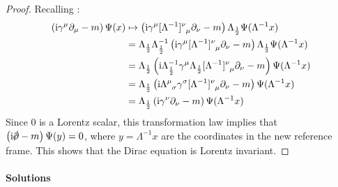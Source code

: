 \begin{proofbox}
  \begin{proof}
    Recalling :
    \begin{equation*}
      \begin{split}
        \left( \img \gamma^\mu \pa_\mu - m \right) \Psi(x)
        &\mapsto \left( \img \gamma^\mu \tensor{[\Lambda^{-1}]}{^\nu_\mu} \pa_\nu - m \right) \Lambda_{\frac{1}{2}} \Psi(\Lambda^{-1}x) \\
        &= \Lambda_{\frac{1}{2}} \Lambda_{\frac{1}{2}}^{-1} \left( \img \gamma^\mu \tensor{[\Lambda^{-1}]}{^\nu_\mu} \pa_\nu - m \right) \Lambda_{\frac{1}{2}} \Psi(\Lambda^{-1}x) \\
        &= \Lambda_{\frac{1}{2}} \left( \img \Lambda_{\frac{1}{2}}^{-1} \gamma^\mu \Lambda_{\frac{1}{2}} \tensor{[\Lambda^{-1}]}{^\nu_\mu} \pa_\nu - m \right) \Psi(\Lambda^{-1}x) \\
        &= \Lambda_{\frac{1}{2}} \left( \img \tensor{\Lambda}{^\mu_\sigma} \gamma^\sigma \tensor{[\Lambda^{-1}]}{^\nu_\mu} \pa_\nu - m \right) \Psi(\Lambda^{-1}x) \\
        &= \Lambda_{\frac{1}{2}} \left( \img \gamma^\nu \pa_\nu - m \right) \Psi(\Lambda^{-1}x)
      \end{split}
    \end{equation*}
    Since $ 0 $ is a Lorentz scalar, this transformation law implies that $ \left( \img \slashed{\pa} - m \right) \Psi(y) = 0 $, where $ y = \Lambda^{-1}x $ are the coordinates in the new reference frame. This shows that the Dirac equation is Lorentz invariant.
  \end{proof}
\end{proofbox}

\paragraph{Solutions}

